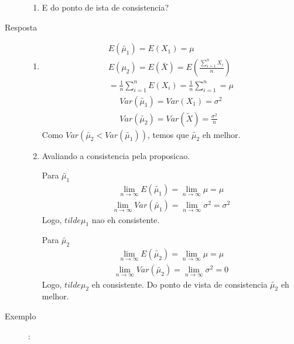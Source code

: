\begin{description}
\begin{enumerate}[label=(\alph*)]
      \item E do ponto de ista de consistencia?
    \end{enumerate}
  \item [Resposta]
    \begin{enumerate}[label=(\alph*)]
      \item 
        \begin{align*}
          E \left(\tilde{\mu_1}\right) = E \left(X_1\right)= \mu\\
          E \left(\mu_2\right) = E \left(\bar{X}\right)= E \left( \frac{ \sum \limits_{i=1}^{n} X_i }{n}\right) \\
          = \frac{1}{n} \sum \limits_{i=1}^{n} E \left(X_i\right) = \frac{1}{n}  \sum \limits_{i=1}^{n}= \mu
        \end{align*}
        \begin{align*}
          Var \left(\tilde{\mu_1}\right) = Var \left(X_1\right)= \sigma^2 \\
          Var \left(\tilde{\mu_2}\right)= Var \left(\tilde{X}\right)= \frac{\sigma^2}{n}
        \end{align*}
        Como $Var(\tilde{\mu_2} < Var(\tilde{\mu_1}))$, temos que $\tilde{\mu_2}$ eh melhor.
      \item Avaliando a consistencia pela proposicao.

        Para $\tilde{\mu_1}$ 
        \begin{align*}
          \lim \limits_{n \to \infty}  E \left(\tilde{\mu_1}\right)= \lim \limits_{n \to \infty} \mu = \mu
        \end{align*}
        \begin{align*}
          \lim \limits_{n \to \infty}  Var \left(\tilde{\mu_1}\right)= \lim \limits_{n \to \infty} \sigma^2 = \sigma^2
        \end{align*}
        Logo, $tilde{\mu_1}$ nao eh consistente.

        Para $\tilde{\mu_2}$ 
        \begin{align*}
          \lim \limits_{n \to \infty}  E \left(\tilde{\mu_2}\right)= \lim \limits_{n \to \infty} \mu = \mu
        \end{align*}
        \begin{align*}
          \lim \limits_{n \to \infty}  Var \left(\tilde{\mu_2}\right)= \lim \limits_{n \to \infty} \sigma^2 = 0
        \end{align*}
        Logo, $tilde{\mu_2}$ eh consistente. Do ponto de vista de consistencia $\tilde{\mu_2}$ eh melhor.
    \end{enumerate}
  \item [Exemplo]: 


\end{description}

